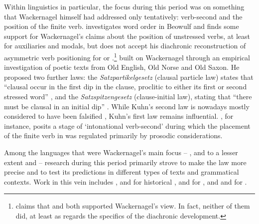 Within  linguistics in particular, the focus during this period was on something that Wackernagel himself had addressed only tentatively: verb-second and the position of the finite verb. \citet[315--318]{Ries1907} investigates word order in Beowulf and finds some support for Wackernagel's claims about the position of unstressed verbs, at least for auxiliaries and modals, but does not accept his diachronic reconstruction of asymmetric verb positioning for  or .\footnote{\citet[15--16]{Hopper1975} claims that \citet{Ries1907} and \citet{Delbrueck1907} both supported Wackernagel's view. In fact, neither of them did, at least as regards the specifics of the diachronic development.} \citet{Kuhn1933} built on Wackernagel through an empirical investigation of poetic texts from Old English, Old Norse and Old Saxon. He proposed two further laws: the  \emph{Satzpartikelgesetz} (clausal particle law) states that ``clausal  occur in the first dip in the clause, proclitic to either its first or second stressed word'' \citep[8]{Kuhn1933}, and the  \emph{Satzspitzengesetz} (clause-initial law), stating that ``there must be clausal  in an initial dip'' \citep[43]{Kuhn1933}. While Kuhn's second law is nowadays mostly considered to have been falsified \citep{Momma1997,Mines2002}, Kuhn's first law remains influential. \citet{Dewey2006}, for instance, posits a stage of `intonational verb-second' during which the placement of the finite verb in  was regulated primarily by prosodic considerations.

Among the languages that were Wackernagel's main focus -- , and to a lesser extent  and  -- research during this period primarily strove to make the law more precise and to test its predictions in different types of texts and grammatical contexts. Work in this vein includes \citet{Dover1960}, \citet{Marshall1987} and \citet{Ruijgh1990} for historical , \citet{Marouzeau1907,Marouzeau1953} and \citet{Fraenkel1932,Fraenkel1933,Fraenkel1965} for , and \citet{Hale1987PhD,Hale1987wackernagel} and \citet{Krisch1990} for .


